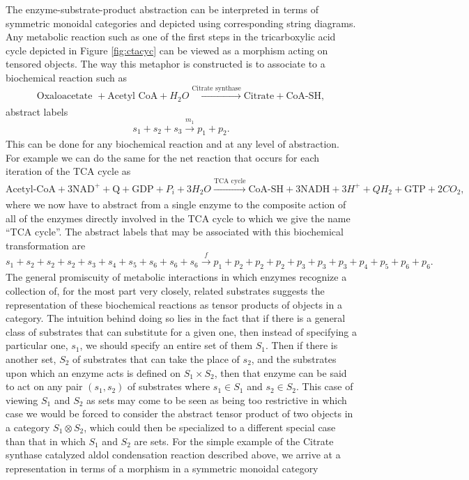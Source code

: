 \documentclass[10pt]{article}
\begin{document}
The enzyme-substrate-product abstraction can be interpreted in terms of symmetric monoidal categories and depicted using corresponding string diagrams. Any metabolic reaction such as one of the first steps in the tricarboxylic acid cycle depicted in Figure \ref{fig:ctacyc} can be viewed as a morphism acting on tensored objects. The way this metaphor is constructed is to associate to a biochemical reaction such as 
$$
\text{Oxaloacetate } + \text{Acetyl CoA} + H_2O \xrightarrow[]{\text{Citrate synthase}} \text{Citrate} + \text{CoA-SH},
$$
abstract labels
$$
s_1 + s_2 + s_3 \xrightarrow[]{m_1} p_1 + p_2.
$$
This can be done for any biochemical reaction and at any level of abstraction. For example we can do the same for the net reaction that occurs for each iteration of the TCA cycle as
$$
\text{Acetyl-CoA} + 3 \text{NAD}^+ + \text{Q} + \text{GDP} + P_i + 3 H_2O \xrightarrow[]{\text{TCA cycle}} \text{CoA-SH} + 3 \text{NADH} + 3H^+ + QH_2 + \text{GTP} + 2 CO_2,
$$
where we now have to abstract from a single enzyme to the composite action of all of the enzymes directly involved in the TCA cycle to which we give the name ``TCA cycle''. The abstract labels that may be associated with this biochemical transformation are
$$
s_1 + s_2 + s_2 + s_2 + s_3 + s_4 + s_5 + s_6 + s_6 + s_6 \xrightarrow[]{f} p_1 + p_2 + p_2 + p_2 + p_3 + p_3  + p_3 + p_4 + p_5 + p_6 + p_6. 
$$
The general promiscuity of metabolic interactions in which enzymes recognize a collection of, for the most part very closely, related substrates suggests the representation of these biochemical reactions as tensor products of objects in a category. The intuition behind doing so lies in the fact that if there is a general class of substrates that can substitute for a given one, then instead of specifying a particular one, $s_1$, we should specify an entire set of them $S_1$. Then if there is another set, $S_2$ of substrates that can take the place of $s_2$, and the substrates upon which an enzyme acts is defined on $S_1 \times S_2$, then that enzyme can be said to act on any pair $(s_1,s_2)$ of substrates where $s_1 \in S_1$ and $s_2 \in S_2$. This case of viewing $S_1$ and $S_2$ as sets may come to be seen as being too restrictive in which case we would be forced to consider the abstract tensor product of two objects in a category $S_1 \otimes S_2$, which could then be specialized to a different special case than that in which $S_1$ and $S_2$ are sets. For the simple example of the Citrate synthase catalyzed aldol condensation reaction described above, we arrive at a representation in terms of a morphism in a symmetric monoidal category
\end{document}
